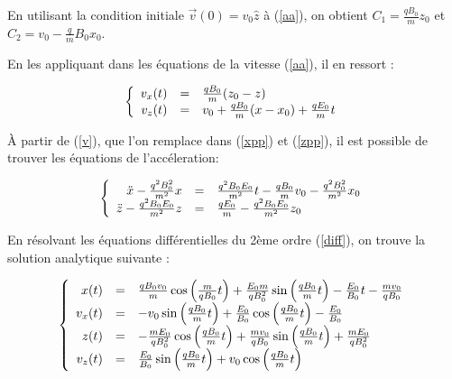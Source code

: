 \documentclass[a4paper,12pt,twoside]{article}
\begin{document}
		\noindent En utilisant la condition initiale $ \vec{v}(0) = v_0\hat{z}$ à (\ref{aa}), on obtient $C_1 = \frac{qB_0}{m}z_0 $ et $C_2 = v_0 -\frac{q}{m}B_0x_0$.

			
		\noindent En les appliquant dans les \'equations de la vitesse (\ref{aa}), il en ressort :
				
			\begin{equation}\label{v}
				\left \{
				\begin{array}{r c l}
					v_x(t) & = & \frac{qB_0}{m}(z_0 - z)\\
					v_z(t) & = & v_0 + \frac{qB_0}{m}(x-x_0) + \frac{qE_0}{m}t\\
				\end{array}
				\right .
			\end{equation}
			
		\noindent \`A partir de (\ref{v}), que l'on remplace dans (\ref{xpp}) et (\ref{zpp}), il est possible de trouver les \'equations de l'acc\'eleration:
		
			\begin{equation} \label{diff}
				\left \{
				\begin{array}{r c l}
					\ddot{x} - \frac{q^2B_0^2}{m^2}x & = & \frac{q^2B_0E_0}{m^2}t-\frac{qB_0 }{m}v_0 - \frac{q^2B_0^2}{m^2}x_0\\
					
					\ddot{z} -\frac{q^2B_0E_0}{m^2}z& = &  \frac{qE_0}{m} -\frac{q^2B_0E_0}{m^2}z_0\\
				\end{array}
				\right .
			\end{equation}
	
	\noindent En r\'esolvant les \'equations diff\'erentielles du 2\`eme ordre (\ref{diff}), on trouve la solution analytique suivante :
	
		\begin{equation} 
			\left \{
			\begin{array}{r c l}
				x(t) & = & \frac{qB_0v_0}{m} \cos \left(\frac{m}{qB_0}t\right) + \frac{E_0m}{qB_0^2} \sin \left(\frac{qB_0}{m}t\right) -\frac{E_0}{B_0}t - \frac{mv_0}{qB_0} \\
				v_x(t) & = & - v_0 \sin\left(\frac{qB_0}{m}t \right) + \frac{E_0}{B_0} \cos \left(\frac{qB_0}{m}t\right) -\frac{E_0}{B_0} \\
				z(t) & = & -\frac{mE_0}{qB_0^2} \cos\left(\frac{qB_0}{m}t\right) + \frac{mv_0}{qB_0} \sin\left(\frac{qB_0}{m}t\right) + \frac{mE_0}{qB_0^2}\\
				v_z(t) & = & \frac{E_0}{B_0} \sin\left(\frac{qB_0}{m}t\right) + v_0\cos\left(\frac{qB_0}{m}t\right)
			\end{array}
			\right .
		\end{equation}
	
\end{document}
